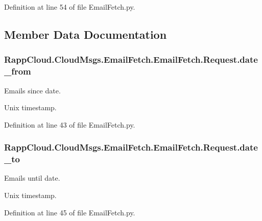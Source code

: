 Definition at line 54 of file Email\-Fetch.\-py.



\subsection{Member Data Documentation}
\hypertarget{classRappCloud_1_1CloudMsgs_1_1EmailFetch_1_1EmailFetch_1_1Request_a2e5c0120bb2bb330e9f3506b477865a9}{
\subsubsection[{date\-\_\-from}]{\setlength{\rightskip}{0pt plus 5cm}Rapp\-Cloud.\-Cloud\-Msgs.\-Email\-Fetch.\-Email\-Fetch.\-Request.\-date\-\_\-from}}\label{classRappCloud_1_1CloudMsgs_1_1EmailFetch_1_1EmailFetch_1_1Request_a2e5c0120bb2bb330e9f3506b477865a9}


Emails since date. 

Unix timestamp. 

Definition at line 43 of file Email\-Fetch.\-py.

\hypertarget{classRappCloud_1_1CloudMsgs_1_1EmailFetch_1_1EmailFetch_1_1Request_ab8cbfb113421da0d7a9d42cbb896cc81}{
\subsubsection[{date\-\_\-to}]{\setlength{\rightskip}{0pt plus 5cm}Rapp\-Cloud.\-Cloud\-Msgs.\-Email\-Fetch.\-Email\-Fetch.\-Request.\-date\-\_\-to}}\label{classRappCloud_1_1CloudMsgs_1_1EmailFetch_1_1EmailFetch_1_1Request_ab8cbfb113421da0d7a9d42cbb896cc81}


Emails until date. 

Unix timestamp. 

Definition at line 45 of file Email\-Fetch.\-py.

